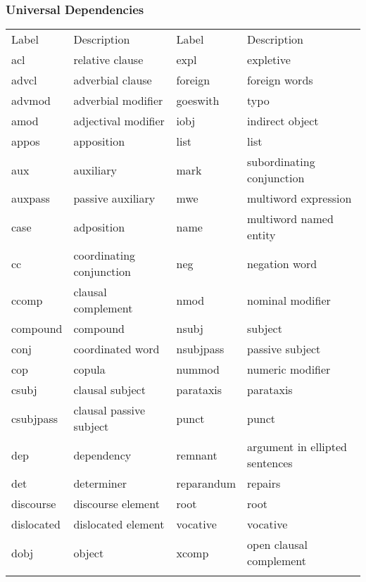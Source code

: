 \documentclass{beamer}
\begin{document}
\begin{frame}
\frametitle{Universal Dependencies}
\begin{table}
\tiny
\label{tab:dep}       
\begin{tabular}{llll}
\hline\noalign{\smallskip}
Label & Description & Label & Description \\
\noalign{\smallskip}\hline\noalign{\smallskip}
acl & relative clause & expl & expletive\\
advcl & adverbial clause & foreign & foreign words\\
advmod & adverbial modifier & goeswith & typo\\
amod & adjectival modifier & iobj & indirect object\\
appos & apposition & list & list\\
aux & auxiliary & mark & subordinating conjunction\\
auxpass & passive auxiliary & mwe & multiword expression\\
case & adposition & name & multiword named entity\\
cc & coordinating conjunction & neg & negation word\\
ccomp & clausal complement & nmod & nominal modifier\\
compound & compound & nsubj & subject\\
conj & coordinated word  & nsubjpass & passive subject\\
cop & copula & nummod & numeric modifier\\
csubj & clausal subject & parataxis & parataxis\\
csubjpass & clausal passive subject &  punct & punct\\
dep & dependency & remnant & argument in ellipted sentences\\
det & determiner &  reparandum & repairs\\
discourse & discourse element & root & root\\
dislocated & dislocated element & vocative & vocative \\
dobj & object & xcomp & open clausal complement\\
\noalign{\smallskip}\hline
\end{tabular}
\end{table}
\end{frame}
\end{document}
